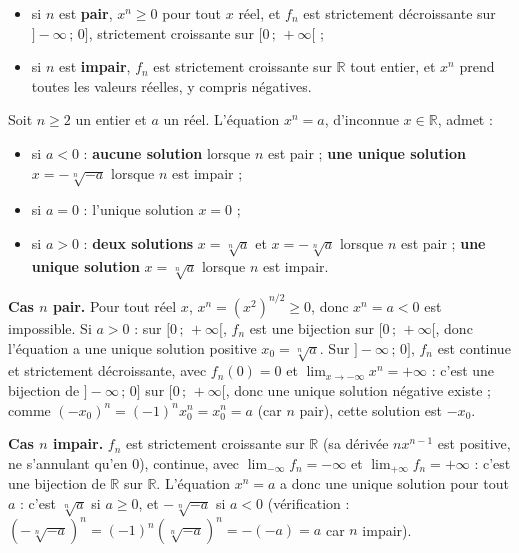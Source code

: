 \documentclass[11pt]{article}
\begin{document}
\begin{itemize}
\item si $n$ est \textbf{pair}, $x^n \geq 0$ pour tout $x$ réel, et $f_n$ est strictement décroissante sur $]-\infty\,;\,0]$, strictement croissante sur $[0\,;\,+\infty[$ ;
\item si $n$ est \textbf{impair}, $f_n$ est strictement croissante sur $\mathbb{R}$ tout entier, et $x^n$ prend toutes les valeurs réelles, y compris négatives.
\end{itemize}

\begin{propriete}[Nombre de solutions de $x^n = a$]
Soit $n \geq 2$ un entier et $a$ un réel. L'équation $x^n = a$, d'inconnue $x \in \mathbb{R}$, admet :
\begin{itemize}
\item si $a < 0$ : \textbf{aucune solution} lorsque $n$ est pair ; \textbf{une unique solution} $x = -\sqrt[n]{-a}$ lorsque $n$ est impair ;
\item si $a = 0$ : l'unique solution $x = 0$ ;
\item si $a > 0$ : \textbf{deux solutions} $x = \sqrt[n]{a}$ et $x = -\sqrt[n]{a}$ lorsque $n$ est pair ; \textbf{une unique solution} $x = \sqrt[n]{a}$ lorsque $n$ est impair.
\end{itemize}
\end{propriete}

\begin{experience}
\textbf{Cas $n$ pair.} Pour tout réel $x$, $x^n = (x^2)^{n/2} \geq 0$, donc $x^n = a < 0$ est impossible. Si $a > 0$ : sur $[0\,;\,+\infty[$, $f_n$ est une bijection sur $[0\,;\,+\infty[$, donc l'équation a une unique solution positive $x_0 = \sqrt[n]{a}$. Sur $]-\infty\,;\,0]$, $f_n$ est continue et strictement décroissante, avec $f_n(0) = 0$ et $\lim_{x \to -\infty} x^n = +\infty$ : c'est une bijection de $]-\infty\,;\,0]$ sur $[0\,;\,+\infty[$, donc une unique solution négative existe ; comme $(-x_0)^n = (-1)^n x_0^n = x_0^n = a$ (car $n$ pair), cette solution est $-x_0$.

\textbf{Cas $n$ impair.} $f_n$ est strictement croissante sur $\mathbb{R}$ (sa dérivée $n x^{n-1}$ est positive, ne s'annulant qu'en $0$), continue, avec $\lim_{-\infty} f_n = -\infty$ et $\lim_{+\infty} f_n = +\infty$ : c'est une bijection de $\mathbb{R}$ sur $\mathbb{R}$. L'équation $x^n = a$ a donc une unique solution pour tout $a$ : c'est $\sqrt[n]{a}$ si $a \geq 0$, et $-\sqrt[n]{-a}$ si $a < 0$ (vérification : $(-\sqrt[n]{-a})^n = (-1)^n (\sqrt[n]{-a})^n = -(-a) = a$ car $n$ impair).
\end{experience}
\end{document}
